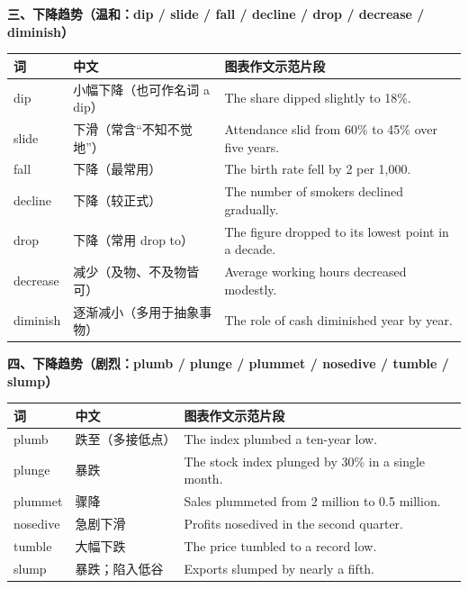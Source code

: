 \documentclass[11pt,a4paper]{ctexart}
\begin{document}
\par\addvspace{5pt}\noindent\textbf{三、下降趋势（温和：dip / slide / fall / decline / drop / decrease / diminish）}\par\addvspace{2pt}
\begin{longtable}{L{2.9cm}L{1.9cm}L{10.9cm}}
\toprule
\textbf{词} & \textbf{中文} & \textbf{图表作文示范片段} \\
\midrule
\endhead
dip & 小幅下降（也可作名词 a dip） & The share dipped slightly to 18\%. \\
slide & 下滑（常含“不知不觉地”） & Attendance slid from 60\% to 45\% over five years. \\
fall & 下降（最常用） & The birth rate fell by 2 per 1,000. \\
decline & 下降（较正式） & The number of smokers declined gradually. \\
drop & 下降（常用 drop to） & The figure dropped to its lowest point in a decade. \\
decrease & 减少（及物、不及物皆可） & Average working hours decreased modestly. \\
diminish & 逐渐减小（多用于抽象事物） & The role of cash diminished year by year. \\
\bottomrule
\end{longtable}

\par\addvspace{5pt}\noindent\textbf{四、下降趋势（剧烈：plumb / plunge / plummet / nosedive / tumble / slump）}\par\addvspace{2pt}
\begin{longtable}{L{2.9cm}L{1.9cm}L{10.9cm}}
\toprule
\textbf{词} & \textbf{中文} & \textbf{图表作文示范片段} \\
\midrule
\endhead
plumb & 跌至（多接低点） & The index plumbed a ten-year low. \\
plunge & 暴跌 & The stock index plunged by 30\% in a single month. \\
plummet & 骤降 & Sales plummeted from 2 million to 0.5 million. \\
nosedive & 急剧下滑 & Profits nosedived in the second quarter. \\
tumble & 大幅下跌 & The price tumbled to a record low. \\
slump & 暴跌；陷入低谷 & Exports slumped by nearly a fifth. \\
\bottomrule
\end{longtable}
\end{document}
